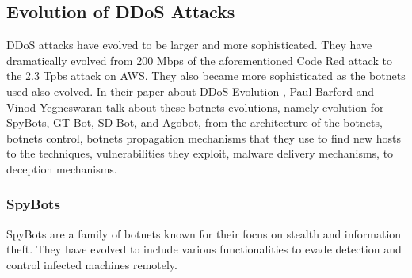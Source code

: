 \documentclass[a4paper, 12pt]{report} %
\begin{document}
        \subsection{Evolution of DDoS Attacks}
            DDoS attacks have evolved to be larger and more sophisticated. They have dramatically evolved from 200 Mbps \cite{ddos_evolution} of the aforementioned Code Red attack to the 2.3 Tpbs attack on AWS. They also became more sophisticated as the botnets used also evolved. In their paper about DDoS Evolution \cite{ddos_evolution}, Paul Barford and Vinod Yegneswaran talk about these botnets evolutions, namely evolution for SpyBots, GT Bot, SD Bot, and Agobot, from the architecture of the botnets, botnets control, botnets propagation mechanisms that they use to find new hosts to the techniques, vulnerabilities they exploit, malware delivery mechanisms, to deception mechanisms. 
            \subsubsection{SpyBots}
            SpyBots are a family of botnets known for their focus on stealth and information theft. They have evolved to include various functionalities to evade detection and control infected machines remotely.
\end{document}
